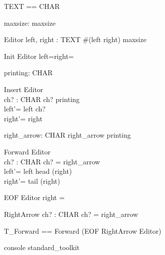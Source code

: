 \documentclass{llncs}
\begin{document}
\begin{zed}
[CHAR]
\end{zed}
\begin{zed}
TEXT == \seq CHAR
\end{zed}
\begin{axdef}
maxsize: \nat
\where maxsize 
\end{axdef}
\begin{schema}{Editor}
left, right : TEXT
\where \#(left \cat right) \leq maxsize
\end{schema}
\begin{schema}{Init}
Editor
\where left=right=\langle \rangle
\end{schema}
\begin{axdef}
printing: \power CHAR
\end{axdef}
\begin{schema}{Insert}
\Delta Editor \\
ch? : CHAR
\where ch? \in printing \\
left'= left \cat \langle ch? \rangle\\
right'= right
\end{schema}
\begin{axdef}
right\_arrow: CHAR 
\where right\_arrow \notin printing
\end{axdef}
\begin{schema}{Forward}
\Delta Editor \\
ch? : CHAR 
\where ch? = right\_arrow \\
left'= left \cat \langle head (right) \rangle \\
right'= tail (right)
\end{schema}
\begin{schema}{EOF}
Editor 
\where right = \langle \rangle
\end{schema}
\begin{schema}{RightArrow}
ch? : CHAR 
\where ch? = right\_arrow
\end{schema}
\begin{zed}
T\_Forward == Forward \lor (EOF \land RightArrow \land \Xi
Editor)
\end{zed}



\begin{zsection}
\SECTION console \parents standard\_toolkit
\end{zsection}

\begin{zed}
[EVENT]
\end{zed}
\end{document}
